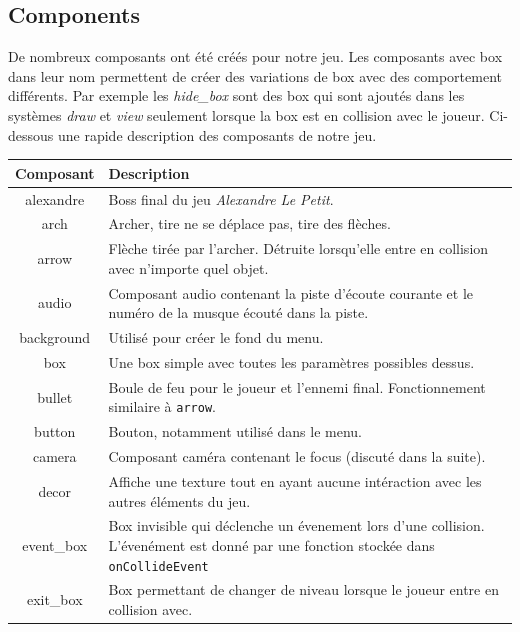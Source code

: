 \documentclass{article}
\begin{document}
\subsection{Components}
De nombreux composants ont été créés pour notre jeu. Les composants avec box dans leur nom permettent de créer des 
variations de box avec des comportement différents. Par exemple les \textit{hide\_box} sont des box qui sont 
ajoutés dans les systèmes \textit{draw} et \textit{view} seulement lorsque la box est en collision avec le joueur.
Ci-dessous une rapide description des composants de notre jeu.
\begin{center}
    \begin{tabular}[h]{ |c|p{10cm}| }
        \hline
        \textbf{Composant} & \textbf{Description} \\
        \hline
        alexandre & Boss final du jeu \textit{Alexandre Le Petit}. \\
        \hline
        arch & Archer, tire ne se déplace pas, tire des flèches. \\
        \hline
        arrow & Flèche tirée par l'archer. Détruite lorsqu'elle entre en collision avec n'importe quel objet. \\
        \hline
        audio & Composant audio contenant la piste d'écoute courante et le numéro de la musque écouté dans la 
        piste. \\
        \hline
        background & Utilisé pour créer le fond du menu. \\
        \hline
        box & Une box simple avec toutes les paramètres possibles dessus. \\
        \hline
        bullet & Boule de feu pour le joueur et l'ennemi final. Fonctionnement similaire à \verb|arrow|. \\
        \hline
        button & Bouton, notamment utilisé dans le menu. \\
        \hline
        camera & Composant caméra contenant le focus (discuté dans la suite). \\
        \hline
        decor & Affiche une texture tout en ayant aucune intéraction avec les autres éléments du jeu. \\
        \hline
        event\_box & Box invisible qui déclenche un évenement lors d'une collision. L'évenément est donné 
        par une fonction stockée dans \verb|onCollideEvent| \\
        \hline
        exit\_box & Box permettant de changer de niveau lorsque le joueur entre en collision avec. \\

\end{tabular}
\end{center}
\end{document}
